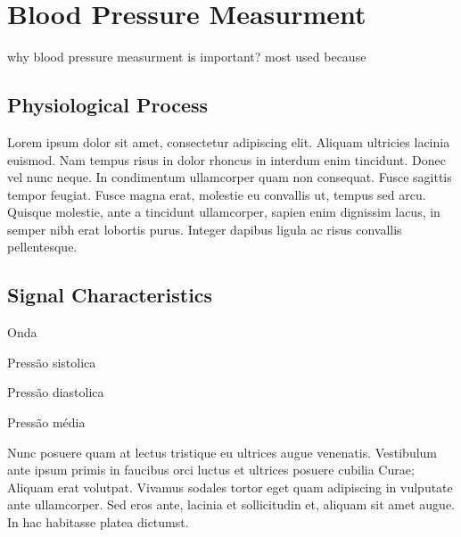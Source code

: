 
\chapter{Blood Pressure Measurment} %

\label{Chapter3} %



why blood pressure measurment is important? most used because

\section{Physiological Process}




Lorem ipsum dolor sit amet, consectetur adipiscing elit. Aliquam ultricies lacinia euismod. Nam tempus risus in dolor rhoncus in interdum enim tincidunt. Donec vel nunc neque. In condimentum ullamcorper quam non consequat. Fusce sagittis tempor feugiat. Fusce magna erat, molestie eu convallis ut, tempus sed arcu. Quisque molestie, ante a tincidunt ullamcorper, sapien enim dignissim lacus, in semper nibh erat lobortis purus. Integer dapibus ligula ac risus convallis pellentesque.

\section{Signal Characteristics}


Onda

Pressão sistolica

Pressão diastolica

Pressão média


Nunc posuere quam at lectus tristique eu ultrices augue venenatis. Vestibulum ante ipsum primis in faucibus orci luctus et ultrices posuere cubilia Curae; Aliquam erat volutpat. Vivamus sodales tortor eget quam adipiscing in vulputate ante ullamcorper. Sed eros ante, lacinia et sollicitudin et, aliquam sit amet augue. In hac habitasse platea dictumst.

